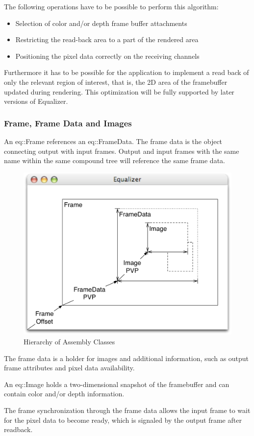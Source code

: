 \documentclass[10pt,a4]{scrartcl}
\begin{document}
The following operations have to be possible to perform this
algorithm:
\begin{itemize}
\item Selection of color and/or depth frame buffer attachments
\item Restricting the read-back area to a part of the rendered area
\item Positioning the pixel data correctly on the receiving channels
\end{itemize}

Furthermore it has to be possible for the application to implement a read back
of only the relevant region of interest, that is, the 2D area of the framebuffer
updated during rendering. This optimization will be fully supported by later
versions of Equalizer.

\subsubsection{Frame, Frame Data and Images}

An \textsf{eq::Frame} references an \textsf{eq::Fra\-me\-Data}. The
frame data is the object connecting output with input frames. Output and
input frames with the same name within the same compound tree will
reference the same frame data.

\begin{figure}
  \includegraphics[width=.618\textwidth]{images/assembly.pdf}
  {\caption{\label{fAssembly}Hierarchy of Assembly Classes}}
\end{figure}
The frame data is a holder for images and additional information, such
as output frame attributes and pixel data availability.

An \textsf{eq::Image} holds a two-dimensional snapshot of the framebuffer and
can contain color and/or depth information.

The frame synchronization through the frame data allows the input frame
to wait for the pixel data to become ready, which is signaled by the
output frame after readback.
\end{document}
